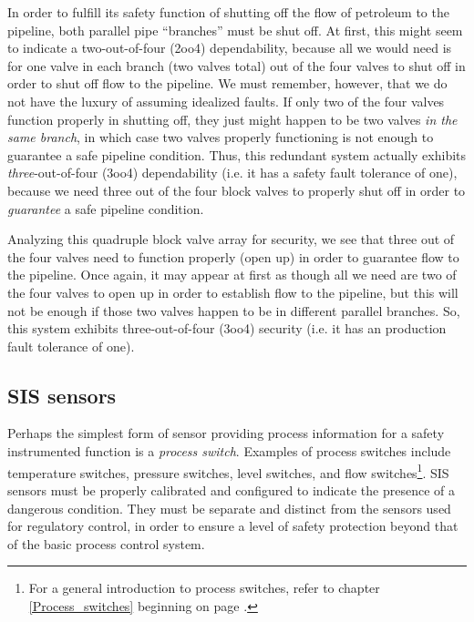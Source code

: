 In order to fulfill its safety function of shutting off the flow of petroleum to the pipeline, both parallel pipe ``branches'' must be shut off.  At first, this might seem to indicate a two-out-of-four (2oo4) dependability, because all we would need is for one valve in each branch (two valves total) out of the four valves to shut off in order to shut off flow to the pipeline.  We must remember, however, that we do not have the luxury of assuming idealized faults.  If only two of the four valves function properly in shutting off, they just might happen to be two valves \textit{in the same branch}, in which case two valves properly functioning is not enough to guarantee a safe pipeline condition.  Thus, this redundant system actually exhibits \textit{three}-out-of-four (3oo4) dependability (i.e. it has a safety fault tolerance of one), because we need three out of the four block valves to properly shut off in order to \textit{guarantee} a safe pipeline condition. 

Analyzing this quadruple block valve array for security, we see that three out of the four valves need to function properly (open up) in order to guarantee flow to the pipeline.  Once again, it may appear at first as though all we need are two of the four valves to open up in order to establish flow to the pipeline, but this will not be enough if those two valves happen to be in different parallel branches.  So, this system exhibits three-out-of-four (3oo4) security (i.e. it has an production fault tolerance of one).







\filbreak
\subsection{SIS sensors}

Perhaps the simplest form of sensor providing process information for a safety instrumented function is a \textit{process switch}.  Examples of process switches include temperature switches, pressure switches, level switches, and flow switches\footnote{For a general introduction to process switches, refer to chapter \ref{Process_switches} beginning on page \pageref{Process_switches}.}.  SIS sensors must be properly calibrated and configured to indicate the presence of a dangerous condition.  They must be separate and distinct from the sensors used for regulatory control, in order to ensure a level of safety protection beyond that of the basic process control system.

